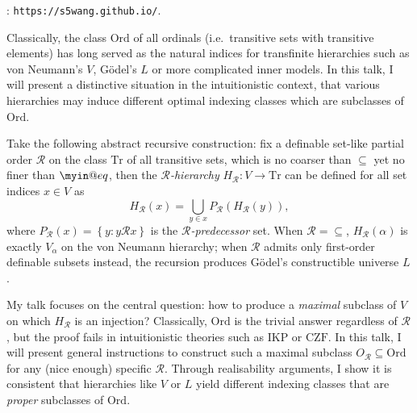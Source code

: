 \documentclass[bsl,meeting]{asl}
\def\urladdr#1{\endgraf\noindent{\it URL Address}: {\tt #1}.}
\newcommand{\NP}{}
\begin{document}
\thispagestyle{empty}

\NP
{}
\urladdr{https://s5wang.github.io/}

Classically, the class $\mathrm{Ord}$ of all ordinals (i.e.\ transitive sets with transitive elements) has long served as the natural indices for transfinite hierarchies such as von Neumann's $V$, G\"odel's $L$ or more complicated inner models. In this talk, I will present a distinctive situation in the intuitionistic context, that various hierarchies may induce different optimal indexing classes which are subclasses of $\mathrm{Ord}$.

\makeatletter
\newsavebox\myin@eqfst
\newsavebox\myin@eqsnd
\def\myineq{\mathrel{\mathpalette\myin@eq\relax}}
\def\myin@eq#1#2{%
  \setbox\myin@eqfst=\hbox{\m@th$#1\in$}%
  \setbox\myin@eqsnd=\hb@xt@\wd\myin@eqfst{\m@th$#1\dabar@$\hss$#1\dabar@$}%
  \vcenter{\offinterlineskip%
    \box\myin@eqfst\vskip-.1\ht\myin@eqsnd%
    \copy\myin@eqsnd\vskip-.5\ht\myin@eqsnd}}
\makeatother

Take the following abstract recursive construction: fix a definable set-like partial order $\mathscr{R}$ on the class $\mathrm{Tr}$ of all transitive sets, which is no coarser than $\subseteq$ yet no finer than $\myineq$, then the \emph{$\mathscr{R}$-hierarchy} $H_\mathscr{R} : V \rightarrow \mathrm{Tr}$ can be defined for all set indices $x \in V$ as
\[H_\mathscr{R}{\left(x\right)} = \bigcup_{y \in x} P_\mathscr{R}{\left(H_\mathscr{R}{\left(y\right)}\right)},\]
where $P_\mathscr{R}{\left(x\right)} = \left\{y : y \mathrel{\mathscr{R}} x\right\}$ is the \emph{$\mathscr{R}$-predecessor} set. When $\mathscr{R} = {\subseteq}$, $H_\mathscr{R}{\left(\alpha\right)}$ is exactly $V_\alpha$ on the von Neumann hierarchy; when $\mathscr{R}$ admits only first-order definable subsets instead, the recursion produces G\"odel's constructible universe $L$.

My talk focuses on the central question: how to produce a \emph{maximal} subclass of $V$ on which $H_\mathscr{R}$ is an injection? Classically, $\mathrm{Ord}$ is the trivial answer regardless of $\mathscr{R}$, but the proof fails in intuitionistic theories such as $\mathrm{IKP}$ or $\mathrm{CZF}$. In this talk, I will present general instructions to construct such a maximal subclass $O_\mathscr{R} \subseteq \mathrm{Ord}$ for any (nice enough) specific $\mathscr{R}$. Through realisability arguments, I show it is consistent that hierarchies like $V$ or $L$ yield different indexing classes that are \emph{proper} subclasses of $\mathrm{Ord}$.
\end{document}
